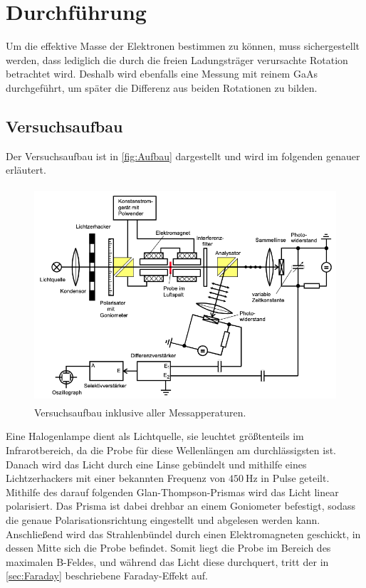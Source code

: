 \section{Durchführung}
\label{sec:Durchführung}

Um die effektive Masse der Elektronen bestimmen zu können, muss sichergestellt werden,
dass lediglich die durch die freien Ladungsträger verursachte Rotation betrachtet wird. Deshalb wird ebenfalls eine Messung
mit reinem GaAs durchgeführt, um später die Differenz aus beiden Rotationen zu bilden.

\subsection{Versuchsaufbau}

Der Versuchsaufbau ist in \autoref{fig:Aufbau} dargestellt und wird im folgenden genauer erläutert.

\begin{figure} [H]
    \centering
    \includegraphics[height=8cm]{content/Aufbau.png}
    \caption{Versuchsaufbau inklusive aller Messapperaturen. \cite{V46}}
    \label{fig:Aufbau}
\end{figure}

Eine Halogenlampe dient als Lichtquelle, sie leuchtet größtenteils im Infrarotbereich, da die Probe für diese Wellenlängen
am durchlässigsten ist. Danach wird das Licht durch eine Linse gebündelt und mithilfe eines Lichtzerhackers mit einer bekannten
Frequenz von $\qty{450}{\Hz}$ in Pulse geteilt. Mithilfe des darauf folgenden Glan-Thompson-Prismas wird das Licht linear polarisiert.
Das Prisma ist dabei drehbar an einem Goniometer befestigt, sodass die genaue Polarisationsrichtung eingestellt und abgelesen werden kann.
Anschließend wird das Strahlenbündel durch einen Elektromagneten geschickt, in dessen Mitte sich die Probe befindet.
Somit liegt die Probe im Bereich des maximalen B-Feldes, und während das Licht diese durchquert, tritt der in \autoref{sec:Faraday}
beschriebene Faraday-Effekt auf.

